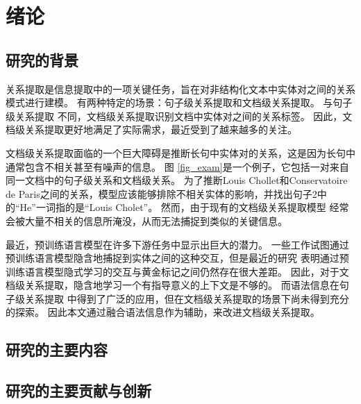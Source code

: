 \documentclass[bachelor]{thesis-uestc}
\begin{document}
\thesistableofcontents

\chapter{绪\hspace{6pt}论}

\begin{comment}
    课题背景，研究现状, 理论依据，实验基础，发展趋势以及本课题的理论意义
\end{comment}
\section{研究的背景}
关系提取是信息提取中的一项关键任务，旨在对非结构化文本中实体对之间的关系模式进行建模。
有两种特定的场景：句子级关系提取和文档级关系提取。
与句子级关系提取 \cite{sentenceRE-Dixit, sentenceRE-Lyu} 不同，文档级关系提取识别文档中实体对之间的关系标签。
因此，文档级关系提取更好地满足了实际需求，最近受到了越来越多的关注。\par

文档级关系提取面临的一个巨大障碍是推断长句中实体对的关系，这是因为长句中通常包含不相关甚至有噪声的信息。
图 \ref{fig_exam}是一个例子，它包括一对来自同一文档中的句子级关系和文档级关系。
为了推断Louis Chollet和Conservatoire de Paris之间的关系，模型应该能够排除不相关实体的影响，并找出句子2中的“He”一词指的是“Louis Cholet”。
然而，由于现有的文档级关系提取模型 \cite{bai-etal-2021-syntax} 经常会被大量不相关的信息所淹没，从而无法捕捉到类似的关键信息。 \par


最近，预训练语言模型在许多下游任务中显示出巨大的潜力。
一些工作\cite{ye-etal-2020-co-ferential, zhou2021document}试图通过预训练语言模型隐含地捕捉到实体之间的这种交互，但是最近的研究 \cite{sundaraman2019syntax, bai-etal-2021-syntax, liu2023document} 表明通过预训练语言模型隐式学习的交互与黄金标记之间仍然存在很大差距。
因此，对于文档级关系提取，隐含地学习一个有指导意义的上下文是不够的。
而语法信息在句子级关系提取 \cite{xu-etal-2016-improved, qin-etal-2021-relation} 中得到了广泛的应用，但在文档级关系提取的场景下尚未得到充分的探索。
因此本文通过融合语法信息作为辅助，来改进文档级关系提取。\par

\section{研究的主要内容}

\section{研究的主要贡献与创新}
\end{document}
